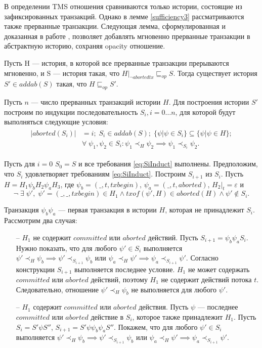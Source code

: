 В определении TMS отношения сравниваются только истории, состоящие из зафиксированных транзакций. Однако в лемме \ref{sufficiency3} рассматриваются также прерванные транзакции. Следующая лемма, сформулированная и доказанная в работе \cite{tms_article}, позволяет добавлять мгновенно прерванные транзакции в абстрактную историю, сохраняя opacity отношение.     
\begin{lemma}\label{sufficiency4}
Пусть H --- история, в которой все прерванные транзакции прерываются мгновенно, и S --- история такая, что $H|_{\neg abortedtx} \sqsubseteq_{op} S$. Тогда существует история $S' \in addab(S)$ такая, что $H \sqsubseteq_{op} S'$. 
\end{lemma}
\begin{myproof}
Пусть $n$ --- число прерванных транзакций истории $H$. Для построения истории $S'$ построим по индукции последовательность $S_i, i = 0 \ldots n$, для которой будут выполняться следующие условия:
\begin{align}\label{eq:SiInduct}
\begin{split}
|aborted(S_i)| &= i; \; S_i \in addab(S); \; \{\psi| \psi \in S_i\} \subseteq \{\psi | \psi \in H \}; \\ &\forall \; \psi_1, \psi_2 \in S_i: \psi_1 \prec_H \psi_2 \implies \psi_1 \prec_{S_i} \psi_2.
\end{split}
\end{align}

Пусть для $i = 0$ $S_0 = S$ и все требования \eqref{eq:SiInduct} выполнены. Предположим, что $S_i$ удовлетворяет требованиям \eqref{eq:SiInduct}. Построим $S_{i+1}$ из $S_i$. Пусть $H = H_1\psi_{b}H_2\psi_{a}H_3$, где $\psi_b = (\_, t, txbegin)$, $\psi_a = (\_,t, aborted)$, $H_2|_t = \varepsilon$ и $$\neg \; \exists \; \psi', \; \psi' = (\_, \_, txbegin) \in H_1 \land txof(\psi', H) \in aborted(H) \land \psi' \notin S_i.$$

Транзакция $\psi_b\psi_a$ --- первая транзакция в истории $H$, которая не принадлежит $S_i$. 
Рассмотрим два случая:
\begin{itemize}[listparindent=1.5em]
\item[--] $H_1$ не содержит $committed$ или $aborted$ действий. Пусть $S_{i+1} = \psi_b\psi_{a}S_i$. Нужно показать, что для любого $\psi' \in S_i$ выполняется $\psi' \prec_H \psi_b \implies \psi' \prec_{S_{i+1}} \psi_b$ или $\psi_a \prec_H \psi' \implies \psi_a \prec_{S_{i+1}} \psi'$. Согласно конструкции $S_{i+1}$ выполняется последнее условие. $H_1$ не может содержать $committed$ или $aborted$ действий, поэтому $H_1$ не содержит действий потока $t$. Следовательно, отношение $\psi' \prec_H \psi_b$ не выполняется для любого $\psi'$. 
\item[--] $H_1$ содержит $committed$ или $aborted$ действия. Пусть $\psi$ --- последнее $committed$ или $aborted$ действие в $S_i$, которое также принадлежит $H_1$. Пусть $S_{i} = S'\psi{S''}$, $S_{i+1} = S'\psi\psi_b\psi_a{S''}$. Покажем, что для любого $\psi' \in S_i$ выполняется $\psi' \prec_H \psi_b \implies \psi' \prec_{S_{i+1}} \psi_b$ или $\psi_a \prec_H \psi' \implies \psi_a \prec_{S_{i+1}} \psi'$.


\end{itemize}
\end{myproof}

